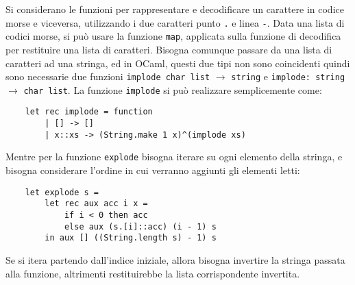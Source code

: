 \documentclass{article}
\numberwithin{equation}{subsection}
\begin{document}
Si considerano le funzioni per rappresentare e decodificare un carattere in codice morse e viceversa, utilizzando i due caratteri punto \verb|.| e linea \verb|-|. Data una lista di codici morse, si può usare la funzione \verb|map|, applicata sulla funzione di decodifica per restituire una lista di caratteri. 
Bisogna comunque passare da una lista di caratteri ad una stringa, ed in OCaml, questi due tipi non sono coincidenti quindi sono necessarie due funzioni \verb|implode char list| $\rightarrow$ \verb|string| e \verb|implode: string| $\rightarrow$ \verb|char list|. La funzione \verb|implode| si può realizzare semplicemente come:
\begin{verbatim}
    let rec implode = function
        | [] -> []
        | x::xs -> (String.make 1 x)^(implode xs)
\end{verbatim}
Mentre per la funzione \verb|explode| bisogna iterare su ogni elemento della stringa, e bisogna considerare l'ordine in cui verranno aggiunti gli elementi letti:
\begin{verbatim}
    let explode s = 
        let rec aux acc i x =
            if i < 0 then acc
            else aux (s.[i]::acc) (i - 1) s
        in aux [] ((String.length s) - 1) s 
\end{verbatim}
Se si itera partendo dall'indice iniziale, allora bisogna invertire la stringa passata alla funzione, altrimenti restituirebbe la lista corrispondente invertita. 
\end{document}
